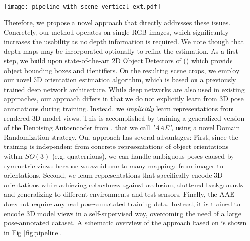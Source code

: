 \begin{figure*}[t]\centering
	\captionsetup{width=\textwidth}
	\texttt{[image: pipeline\_with\_scene\_vertical\_ext.pdf]}
\caption{Our full 6D Object Detection pipeline: after detecting an object (2D Object Detector), the object is quadratically cropped and forwarded into the proposed Augmented Autoencoder. In the next step, the bounding box scale ratio at the estimated 3D orientation $\hat{R'}_{obj2cam}$ is used to compute the 3D translation $\hat{t}_{obj2cam}$. The resulting euclidean transformation $\hat{H'}_{obj2cam}  \in \mathcal{R}^{4x4}$ already shows promising results as presented in \cite{sundermeyer2018implicit}, however it still lacks of accuracy given a translation in the image plane towards the borders. Therefore, the pipeline is extended by the Perspective Correction block which addresses this problem and results in more accurate 6D pose estimates $\hat{H}_{obj2cam}$ for objects which are not located in the image center. Additionally, given depth data, the result can be further refined ($\hat{H}_{obj2cam}^{(refined)}$) by applying an Iterative Closest Point post-processing (bottom).}	\label{fig:pipeline}
\end{figure*}

Therefore, we propose a novel approach that directly
addresses these issues. Concretely, our method operates on single
RGB images, which significantly increases the usability as no depth
information is required. We note though that depth maps may be
incorporated optionally to refine the estimation. As a first
step, we build upon state-of-the-art 2D Object Detectors of (\cite{liu2016ssd,lin2018focal}) which provide object bounding boxes and identifiers. On the resulting scene crops, we
employ our novel 3D orientation estimation algorithm, which is based on a
previously trained deep network architecture. While deep networks are
also used in existing approaches, our approach differs in that we do
not explicitly learn from 3D pose annotations during training. Instead, we
\emph{implicitly} learn representations from rendered 3D model views. This is accomplished by training a generalized version of the Denoising Autoencoder from \cite{vincent2010stacked}, that we call \textit{'\gls{AAE}'}, using a novel Domain Randomization strategy. 
Our approach has several
advantages: First, since the training is independent from concrete representations of object orientations within $SO(3)$ (e.g. 
quaternions), we can handle ambiguous poses caused by symmetric views because we avoid one-to-many mappings from images to orientations. Second, we learn representations that specifically encode 3D orientations while achieving
robustness against occlusion, cluttered backgrounds and generalizing to different environments and test sensors. Finally, the \gls{AAE} does not require any real pose-annotated training data. Instead, it is trained to encode 3D model views in a self-supervised way, overcoming the need of a large pose-annotated dataset. A schematic overview of the approach based on \cite{sundermeyer2018implicit} is shown in Fig \ref{fig:pipeline}.

